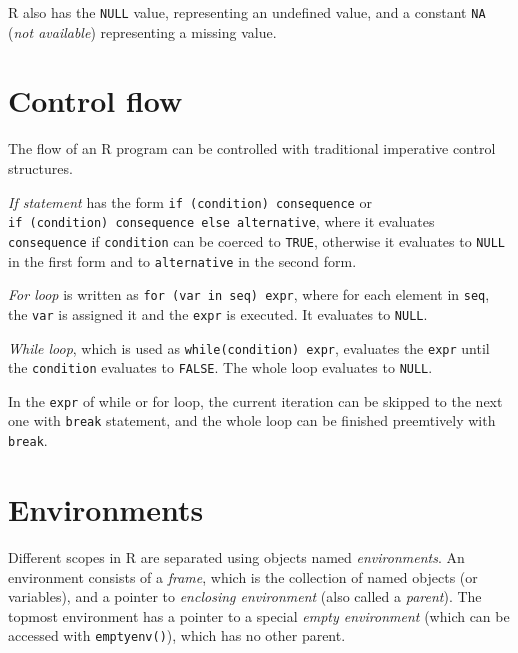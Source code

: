 R also has the \texttt{NULL} value, representing an undefined value, and a constant \texttt{NA} (\textit{not available}) representing a missing value.

\section{Control flow}

The flow of an R program can be controlled with traditional imperative control structures.

\textit{If statement} has the form \texttt{if (condition) consequence} or \\ \texttt{if (condition) consequence else alternative}, where it evaluates \texttt{consequence} if \texttt{condition} can be coerced to \texttt{TRUE}, otherwise it evaluates to \texttt{NULL} in the first form and to \texttt{alternative} in the second form.

\textit{For loop} is written as \texttt{for (var in seq) expr}, where for each element in \texttt{seq}, the \texttt{var} is assigned it and the \texttt{expr} is executed. It evaluates to \texttt{NULL}.

\textit{While loop}, which is used as \texttt{while(condition) expr}, evaluates the \texttt{expr} until the \texttt{condition} evaluates to \texttt{FALSE}. The whole loop evaluates to \texttt{NULL}.

In the \texttt{expr} of while or for loop, the current iteration can be skipped to the next one with \texttt{break} statement, and the whole loop can be finished preemtively with \texttt{break}.

\section{Environments}

Different scopes in R are separated using objects named \textit{environments}. An environment consists of a \textit{frame}, which is the collection of named objects (or variables), and a pointer to \textit{enclosing environment} (also called a \textit{parent}). The topmost environment has a pointer to a special \textit{empty environment} (which can be accessed with \texttt{emptyenv()}), which has no other parent.

